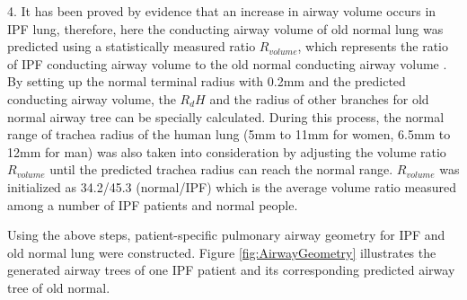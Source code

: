 4. It has been proved by evidence that an increase in airway volume occurs in IPF lung, therefore, here the conducting airway volume of old normal lung was predicted using a statistically measured ratio $R_{volume}$, which represents the ratio of IPF conducting airway volume to the old normal conducting airway volume \citep{plantier2016increased}. By setting up the normal terminal radius with 0.2mm and the predicted conducting airway volume, the $R_dH$ and the radius of other branches for old normal airway tree can be specially calculated. During this process, the normal range of trachea radius of the human lung (5mm to 11mm for women, 6.5mm to 12mm for man) was also taken into consideration \citep{breatnach1984dimensions} by adjusting the volume ratio $R_{volume}$ until the predicted trachea radius can reach the normal range. $R_{volume}$ was initialized as 34.2/45.3 (normal/IPF) which is the average volume ratio measured among a number of IPF patients and normal people. 

Using the above steps, patient-specific pulmonary airway geometry for IPF and old normal lung were constructed. Figure \ref{fig:AirwayGeometry} illustrates the generated airway trees of one IPF patient and its corresponding predicted airway tree of old normal. 

